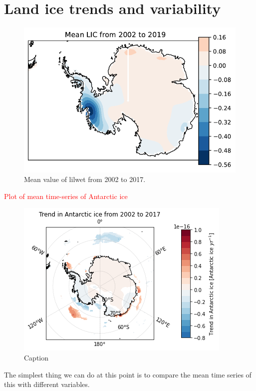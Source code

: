 \documentclass[../main.tex]{subfiles}
\begin{document}
\section{Land ice trends and variability}
 \begin{figure}[H]
     \centering
     \includegraphics{images/2021w4/mean_spatial_plots2/hres/LIC}
     \caption{Mean value of \gls{lilwet} from 2002 to 2017.}
     \label{fig:lilwet_mean}
 \end{figure}
 
\textcolor{red}{Plot of mean time-series of Antarctic ice}\\
\begin{figure}[H]
    \centering
    \includegraphics{images/2021w5/chapter7/lres/trend_spatial_ICE.png}
    \caption{Caption}
    \label{fig:my_label}
\end{figure}

The simplest thing we can do at this point is to compare the mean time series of this with different variables.
\end{document}
